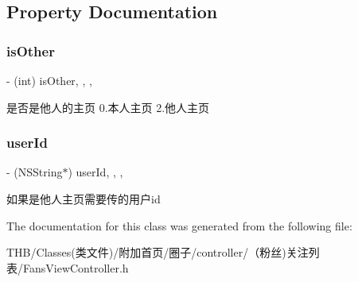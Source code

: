 \subsection{Property Documentation}
\mbox{\label{interface_fans_view_controller_a7acef79a23e48cf84651b7fe0cf03ef5}} 
\subsubsection{\texorpdfstring{is\+Other}{isOther}}
{\footnotesize\ttfamily -\/ (int) is\+Other\hspace{0.3cm}{\ttfamily [read]}, {\ttfamily [write]}, {\ttfamily [nonatomic]}, {\ttfamily [assign]}}

是否是他人的主页 0.本人主页 2.他人主页 \mbox{\label{interface_fans_view_controller_a899cdc718e0fda339eb956a66a9cb89d}} 
\subsubsection{\texorpdfstring{user\+Id}{userId}}
{\footnotesize\ttfamily -\/ (N\+S\+String$\ast$) user\+Id\hspace{0.3cm}{\ttfamily [read]}, {\ttfamily [write]}, {\ttfamily [nonatomic]}, {\ttfamily [strong]}}

如果是他人主页需要传的用户id 

The documentation for this class was generated from the following file\+:\begin{DoxyCompactItemize}
\item 
T\+H\+B/\+Classes(类文件)/附加首页/圈子/controller/（粉丝)关注列表/Fans\+View\+Controller.\+h\end{DoxyCompactItemize}
